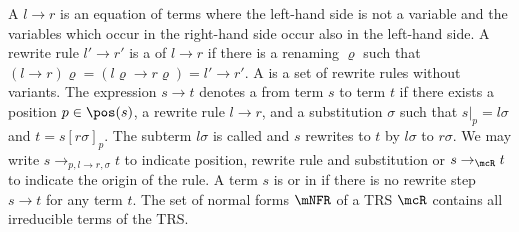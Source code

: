 \begin{definition}
A   \( l \rightarrow r \) is an equation of terms where the left-hand side is not a variable
and the variables which occur in the right-hand side occur also in the left-hand side.
A rewrite rule \( l'\rightarrow r' \) is a  of \( l\rightarrow r \) if there is a renaming \( \varrho \) such that
\( (l\rightarrow r)\varrho = (l\varrho\rightarrow r\varrho) = l'\rightarrow r' \).
A  is a set of rewrite rules without variants.
%
The expression \( s\rightarrow t \) denotes a 
from term \( s \) to term \( t \)
if there exists
a position \( p\in\pos(s) \),
a rewrite rule \( l\rightarrow r \),
and a substitution \( \sigma \) such that
\( s|_p=l\sigma \) and \( t=s[r\sigma]_p \).
The subterm \( l\sigma \) is called  and
\( s \) rewrites to \( t \) by  \( l\sigma \) to  \( r\sigma \).
%
We may write
\( s\rightarrow_{p,l\rightarrow r,\sigma}t \) to indicate position, rewrite rule and substitution
or \( s\rightarrow_\mcR t \) to indicate the origin of the rule.
%
A term \( s \) is  or in  if there is no rewrite step \( s\rightarrow t \) for any term \( t \).
The set of normal forms \( \mNFR \) of a TRS \( \mcR \) contains all irreducible terms of the TRS.
%
\end{definition}
